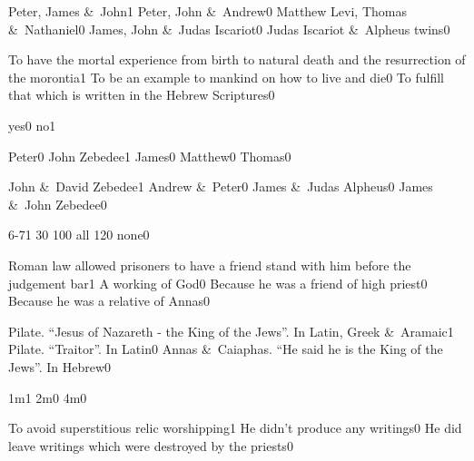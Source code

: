 {Peter, James \&\ John}{1}
{Peter, John \&\ Andrew}{0}
{Matthew Levi, Thomas \&\ Nathaniel}{0}
{James, John \&\ Judas Iscariot}{0}
{Judas Iscariot \&\ Alpheus twins}{0}
\qstop

{To have the mortal experience from birth to natural death and the resurrection of the morontia}{1}
{To be an example to mankind on how to live and die}{0}
{To fulfill that which is written in the Hebrew Scriptures}{0}
\qstop

{yes}{0}
{no}{1}
\qstop

{Peter}{0}
{John Zebedee}{1}
{James}{0}
{Matthew}{0}
{Thomas}{0}
\qstop

{John \&\ David Zebedee}{1}
{Andrew \&\ Peter}{0}
{James \&\ Judas Alpheus}{0}
{James \&\ John Zebedee}{0}
\qstop

{6-7}{1}
{3}{0}
{10}{0}
{all 12}{0}
{none}{0}
\qstop

{Roman law allowed prisoners to have a friend stand with him before the judgement bar}{1}
{A working of God}{0}
{Because he was a friend of high priest}{0}
{Because he was a relative of Annas}{0}
\qstop

{Pilate. ``Jesus of Nazareth - the King of the Jews''. In Latin, Greek \&\ Aramaic}{1}
{Pilate. ``Traitor''. In Latin}{0}
{Annas \&\ Caiaphas. ``He said he is the King of the Jews''. In Hebrew}{0}
\qstop

{1m}{1}
{2m}{0}
{4m}{0}
\qstop

{To avoid superstitious relic worshipping}{1}
{He didn't produce any writings}{0}
{He did leave writings which were destroyed by the priests}{0}
\qstop

